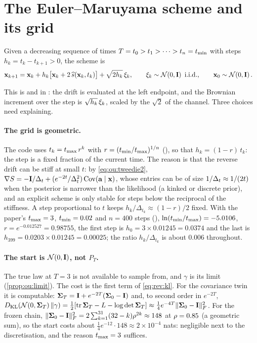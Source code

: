 \section{The Euler--Maruyama scheme and its grid}
\label{sec:rev:euler}

\begin{definition}
\label{def:rev:em}
Given a decreasing sequence of times $T=t_0>t_1>\dots>t_n=t_{\min}$ with steps
$h_k=t_k-t_{k+1}>0$, the scheme is
\begin{equation}
  \mathbf{x}_{k+1}=\mathbf{x}_k+h_k\bigl[\mathbf{x}_k+2\,\widehat s(\mathbf{x}_k,t_k)\bigr]+\sqrt{2h_k}\,\mathbf{\xi}_k,
  \qquad\mathbf{\xi}_k\sim\mathcal{N}\!\left(0,\mathbf{I}\right)\ \text{i.i.d.},\qquad \mathbf{x}_0\sim\mathcal{N}\!\left(0,\mathbf{I}\right).
  \label{eq:rev:euler}
\end{equation}
\end{definition}

This is  and  in
: the drift is evaluated at the left endpoint, and
the Brownian increment over the step is $\sqrt{h_k}\,\mathbf{\xi}_k$, scaled by the
$\sqrt2$ of the channel. Three choices need explaining.

\paragraph{The grid is geometric.} The code uses $t_k=t_{\max}\,r^{k}$ with
$r=(t_{\min}/t_{\max})^{1/n}$ (), so that $h_k=(1-r)\,t_k$: the step is a
fixed fraction of the current time. The reason is that the reverse drift can be stiff
at small $t$: by \cref{eq:ou:tweedie2}, $\nabla S=-\mathbf{I}/\Delta_t+(e^{-2t}/\Delta_t^2)\operatorname{Cov}(\mathbf{a}\mid\mathbf{x})$,
whose entries can be of size $1/\Delta_t\approx1/(2t)$ when the posterior is narrower than
the likelihood (a kinked or discrete prior), and an explicit scheme is only stable for
steps below the reciprocal of the stiffness. A step proportional to $t$ keeps
$h_k/\Delta_{t_k}\approx(1-r)/2$ fixed. With the paper's $t_{\max}=3$, $t_{\min}=0.02$ and
$n=400$ steps (), $\ln(t_{\min}/t_{\max})=-5.0106$,
$r=e^{-0.012527}=0.98755$, the first step is $h_0=3\times0.01245=0.0374$ and the last
is $h_{399}=0.0203\times0.01245=0.00025$; the ratio $h_k/\Delta_{t_k}$ is about $0.006$
throughout.

\paragraph{The start is $\mathcal{N}\!\left(0,\mathbf{I}\right)$, not $P_T$.} The true law at $T=3$ is
not available to sample from, and $\gamma$ is its limit (\cref{prop:ou:limit}). The
cost is the first term of \cref{eq:rev:kl}. For the covariance twin it is computable:
$\mathbf{\Sigma}_T=\mathbf{I}+e^{-2T}(\mathbf{\Sigma}_0-\mathbf{I})$ and, to second order in $e^{-2T}$,
$D_{\mathrm{KL}}(\mathcal{N}\!\left(0,\mathbf{\Sigma}_T\right)\|\gamma)=\tfrac12[\operatorname{tr}\mathbf{\Sigma}_T-L-\log\det\mathbf{\Sigma}_T]\approx\tfrac14e^{-4T}\lVert \mathbf{\Sigma}_0-\mathbf{I} \rVert_{F}^2$.
For the frozen chain, $\lVert \mathbf{\Sigma}_0-\mathbf{I} \rVert_{F}^2=2\sum_{k=1}^{31}(32-k)\rho^{2k}\approx148$
at $\rho=0.85$ (a geometric sum), so the start costs about $\tfrac14e^{-12}\cdot148\approx2\times10^{-4}$
nats: negligible next to the discretisation, and the reason $t_{\max}=3$ suffices.

